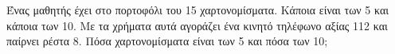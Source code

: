 Ένας μαθητής έχει στο πορτοφόλι του 15 χαρτονομίσματα. Κάποια είναι των 5\officialeuro\; και κάποια των 10\officialeuro. Με τα χρήματα αυτά αγοράζει ένα κινητό τηλέφωνο αξίας 112\officialeuro\; και παίρνει ρέστα 8\officialeuro. Πόσα χαρτονομίσματα είναι των 5\officialeuro\; και πόσα των 10\officialeuro;
